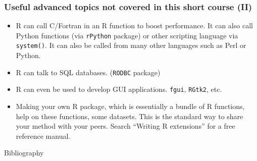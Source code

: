 \begin{frame}
  \frametitle{Useful advanced topics not covered in this short course (II)}
  \begin{itemize}
  \item R can call C/Fortran in an R function to boost performance. It
    can also call Python functions (via \texttt{rPython} package) or
    other scripting language via \texttt{system()}. It can also be
    called from many other languages such as Perl or Python.
  \item R can talk to SQL databases. (\texttt{RODBC} package)
  \item R can even be used to develop GUI applications. \texttt{fgui},
    \texttt{RGtk2}, etc.
  \item Making your own R package, which is essentially a bundle of R
    functions, help on these functions, some datasets. This is the
    standard way to share your method with your peers. Search
    ``Writing R extensions'' for a free reference manual.
  \end{itemize}
\end{frame}

\begin{frame}[allowframebreaks]{Bibliography}
  
  
\end{frame}


